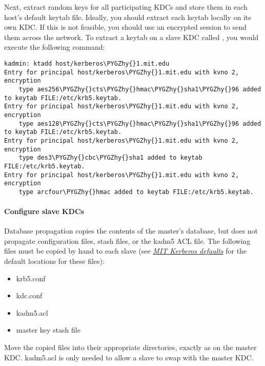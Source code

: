 \documentclass[letterpaper,10pt,english]{sphinxmanual}
\def\PYGZhy{\char`\-}
\begin{document}
Next, extract  random keys for all participating KDCs and
store them in each host's default keytab file.  Ideally, you should
extract each keytab locally on its own KDC.  If this is not feasible,
you should use an encrypted session to send them across the network.
To extract a keytab on a slave KDC called , you
would execute the following command:

\begin{Verbatim}[commandchars=\\\{\}]
kadmin: ktadd host/kerberos\PYGZhy{}1.mit.edu
Entry for principal host/kerberos\PYGZhy{}1.mit.edu with kvno 2, encryption
    type aes256\PYGZhy{}cts\PYGZhy{}hmac\PYGZhy{}sha1\PYGZhy{}96 added to keytab FILE:/etc/krb5.keytab.
Entry for principal host/kerberos\PYGZhy{}1.mit.edu with kvno 2, encryption
    type aes128\PYGZhy{}cts\PYGZhy{}hmac\PYGZhy{}sha1\PYGZhy{}96 added to keytab FILE:/etc/krb5.keytab.
Entry for principal host/kerberos\PYGZhy{}1.mit.edu with kvno 2, encryption
    type des3\PYGZhy{}cbc\PYGZhy{}sha1 added to keytab FILE:/etc/krb5.keytab.
Entry for principal host/kerberos\PYGZhy{}1.mit.edu with kvno 2, encryption
    type arcfour\PYGZhy{}hmac added to keytab FILE:/etc/krb5.keytab.
\end{Verbatim}


\paragraph{Configure slave KDCs}
\label{admin/install_kdc:configure-slave-kdcs}
Database propagation copies the contents of the master's database, but
does not propagate configuration files, stash files, or the kadm5 ACL
file.  The following files must be copied by hand to each slave (see
{\hyperref[mitK5defaults:mitk5defaults]{\emph{MIT Kerberos defaults}}} for the default locations for these files):
\begin{itemize}
\item {} 
krb5.conf

\item {} 
kdc.conf

\item {} 
kadm5.acl

\item {} 
master key stash file

\end{itemize}

Move the copied files into their appropriate directories, exactly as
on the master KDC.  kadm5.acl is only needed to allow a slave to swap
with the master KDC.
\end{document}
